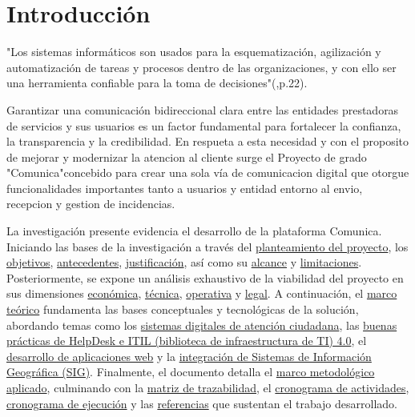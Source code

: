 

\section{Introducción}

"Los sistemas informáticos son usados para la esquematización, agilización y 
automatización de tareas y procesos dentro de las organizaciones, y con ello ser una 
herramienta confiable para la toma de decisiones"(\cite{trejo2019sistema},p.22). 

Garantizar una comunicación bidireccional clara entre las entidades prestadoras de servicios y sus usuarios es un factor fundamental para fortalecer la confianza, la transparencia y la credibilidad. En respueta a esta necesidad y con el proposito de mejorar y modernizar la atencion al cliente surge el Proyecto de grado "Comunica"concebido para crear una sola vía de comunicacion  digital que otorgue funcionalidades importantes tanto a usuarios y entidad entorno al envio, recepcion y gestion de incidencias. 




La investigación presente evidencia el desarrollo de la plataforma Comunica. Iniciando las bases de la investigación a través del \hyperref[subsec:planteamiento]{planteamiento del proyecto}, los \hyperref[subsec:objetivos]{objetivos}, \hyperref[subsec:antecedentes]{antecedentes}, \hyperref[subsec:justificacion]{justificación}, así como su \hyperref[subsec:alcance]{alcance} y \hyperref[subsec:limitaciones]{limitaciones}. Posteriormente, se expone un análisis exhaustivo de la viabilidad del proyecto en sus dimensiones \hyperref[subsec:economica]{económica}, \hyperref[subsec:tecnica]{técnica}, \hyperref[subsec:operativa]{operativa} y \hyperref[subsec:legal]{legal}. A continuación, el \hyperref[subsec:marco_teorico]{marco teórico} fundamenta las bases conceptuales y tecnológicas de la solución, abordando temas como los \hyperref[subsec:sistemas_atencion]{sistemas digitales de atención ciudadana}, las \hyperref[subsec:helpdesk_itil]{buenas prácticas de HelpDesk e ITIL (biblioteca de infraestructura de TI) 4.0}, el \hyperref[subsec:desarrollo_web]{desarrollo de aplicaciones web} y la \hyperref[subsec:sig]{integración de Sistemas de Información Geográfica (SIG)}. Finalmente, el documento detalla el \hyperref[subsec:marco_metodologico]{marco metodológico aplicado}, culminando con la \hyperref[subsec:matriz_trazabilidad]{matriz de trazabilidad}, el \hyperref[subsec:cronograma]{cronograma de actividades}, \hyperref[subsec:cronogramaEjecucion]{cronograma de ejecución}  y las \hyperref[subsec:referencias]{referencias} que sustentan el trabajo desarrollado.

